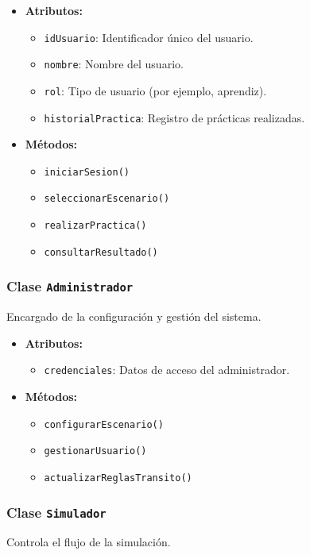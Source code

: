 \documentclass[12pt]{article}
\begin{document}
	\begin{itemize}
		\item \textbf{Atributos:}
		\begin{itemize}
			\item \texttt{idUsuario}: Identificador único del usuario.
			\item \texttt{nombre}: Nombre del usuario.
			\item \texttt{rol}: Tipo de usuario (por ejemplo, aprendiz).
			\item \texttt{historialPractica}: Registro de prácticas realizadas.
		\end{itemize}
		\item \textbf{Métodos:}
		\begin{itemize}
			\item \texttt{iniciarSesion()}
			\item \texttt{seleccionarEscenario()}
			\item \texttt{realizarPractica()}
			\item \texttt{consultarResultado()}
		\end{itemize}
	\end{itemize}
	
	\subsubsection*{Clase \texttt{Administrador}}
	Encargado de la configuración y gestión del sistema.
	
	\begin{itemize}
		\item \textbf{Atributos:}
		\begin{itemize}
			\item \texttt{credenciales}: Datos de acceso del administrador.
		\end{itemize}
		\item \textbf{Métodos:}
		\begin{itemize}
			\item \texttt{configurarEscenario()}
			\item \texttt{gestionarUsuario()}
			\item \texttt{actualizarReglasTransito()}
		\end{itemize}
	\end{itemize}
	
	\subsubsection*{Clase \texttt{Simulador}}
	Controla el flujo de la simulación.
	
\end{document}
